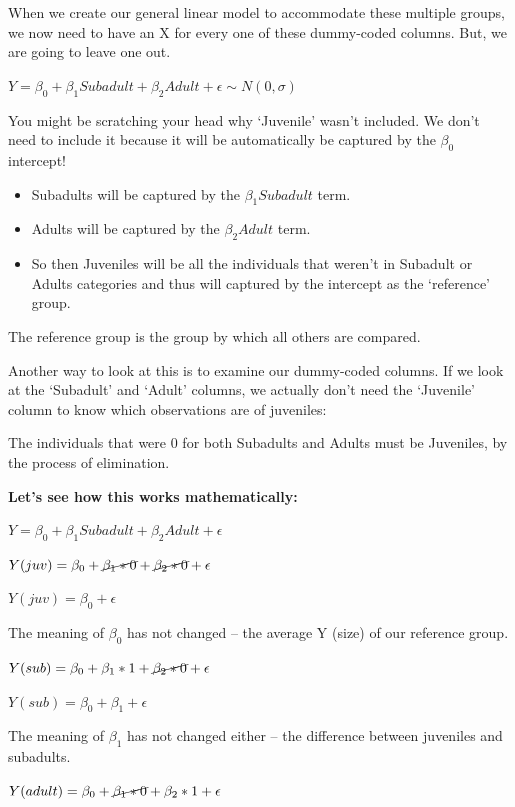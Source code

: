 \documentclass[
]{article}
\providecommand{\tightlist}{%
  \setlength{\itemsep}{0pt}\setlength{\parskip}{0pt}}
\begin{document}
When we create our general linear model to accommodate these multiple
groups, we now need to have an X for every one of these dummy-coded
columns. But, we are going to leave one out.

\textbf{\(Y = \beta_0 + \beta_1 Subadult + \beta_2 Adult + \epsilon \sim N(0, \sigma)\)}

You might be scratching your head why `Juvenile' wasn't included. We
don't need to include it because it will be automatically be captured by
the \(\beta_0\) intercept!

\begin{itemize}
\tightlist
\item
  Subadults will be captured by the \(\beta_1 Subadult\) term.
\item
  Adults will be captured by the \(\beta_2 Adult\) term.
\item
  So then Juveniles will be all the individuals that weren't in Subadult
  or Adults categories and thus will captured by the intercept as the
  `reference' group.
\end{itemize}

The reference group is the group by which all others are compared.

Another way to look at this is to examine our dummy-coded columns. If we
look at the `Subadult' and `Adult' columns, we actually don't need the
`Juvenile' column to know which observations are of juveniles:

The individuals that were 0 for both Subadults and Adults must be
Juveniles, by the process of elimination.

\textbf{Let's see how this works mathematically:}

\textbf{\(Y = \beta_0 + \beta_1 Subadult + \beta_2 Adult + \epsilon\)}

\textbf{\(Y(juv) = \beta_0 + \cancel{\beta_1 * 0} + \cancel{\beta_2 * 0} + \epsilon\)}

\textbf{\(Y(juv) = \beta_0 + \epsilon\)}

The meaning of \(\beta_0\) has not changed -- the average Y (size) of
our reference group.

\textbf{\(Y(sub) = \beta_0 + \beta_1 * 1 + \cancel{\beta_2 * 0} + \epsilon\)}

\textbf{\(Y(sub) = \beta_0 + \beta_1 + \epsilon\)}

The meaning of \(\beta_1\) has not changed either -- the difference
between juveniles and subadults.

\textbf{\(Y(adult) = \beta_0 + \cancel{\beta_1 * 0} + \beta_2 * 1 + \epsilon\)}
\end{document}
